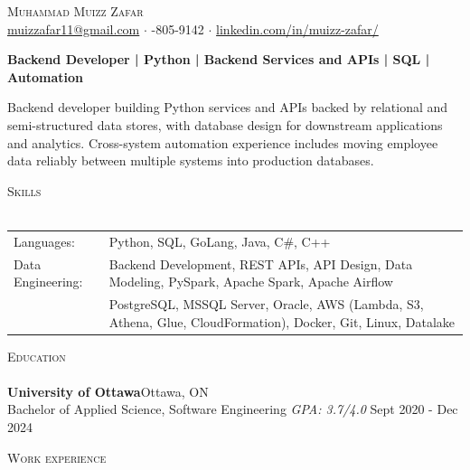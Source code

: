 \documentclass[a4paper]{article}
\newcommand{\lineunder} {
    \vspace*{-8pt} \\
    \hspace*{-18pt} \hrulefill \\
}
\newcommand{\header} [1] {
    {\hspace*{-18pt}\vspace*{6pt} \textsc{#1}}
    \vspace*{-6pt} \lineunder
}
\begin{document}
\vspace*{-40pt}

\vspace*{-10pt}
\begin{center}
	{\Huge \scshape {Muhammad Muizz Zafar}}\\
	\faSend \space \href{mailto:muizzafar11@gmail.com}{muizzafar11@gmail.com} $\cdot$ \faPhoneSquare {}-805-9142 $\cdot$ \faLinkedinSquare \space \href{https://www.linkedin.com/in/muizz-zafar/}{linkedin.com/in/muizz-zafar/}
	\\
\end{center}

\vspace{-5pt}
\begin{center}
\textbf{Backend Developer | Python | Backend Services and APIs | SQL | Automation}
\end{center}
\begin{center}
Backend developer building Python services and APIs backed by relational and semi-structured data stores, with database design for downstream applications and analytics. Cross-system automation experience includes moving employee data reliably between multiple systems into production databases.
\end{center}

\header{Skills}
\begin{tabular}{ l l }
	Languages: 
& Python, SQL, GoLang, Java, C\#, C++ \\

Data Engineering: 
& Backend Development, REST APIs, API Design, Data Modeling, PySpark, Apache Spark, Apache Airflow\\
& PostgreSQL, MSSQL Server, Oracle, AWS (Lambda, S3, Athena, Glue, CloudFormation), Docker, Git, Linux, Datalake

\end{tabular}

\header{Education}
\textbf{University of Ottawa}\hfill Ottawa, ON\\
Bachelor of Applied Science, Software Engineering \textit{GPA: 3.7/4.0} \hfill Sept 2020 - Dec 2024\\
\vspace{2mm}

\header{Work experience}
\vspace{1.5mm}
\end{document}
